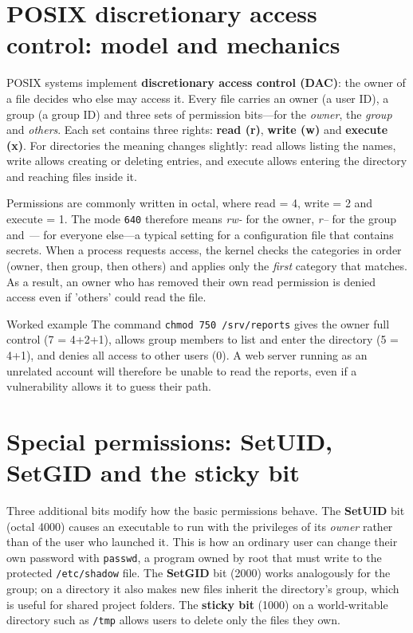 \section{POSIX discretionary access control: model and mechanics}\label{sec:2.1}
POSIX systems implement \textbf{discretionary access control (DAC)}: the owner of a file decides who else may access it. Every file carries an owner (a user ID), a group (a group ID) and three sets of permission bits—for the \emph{owner}, the \emph{group} and \emph{others}. Each set contains three rights: \textbf{read (r)}, \textbf{write (w)} and \textbf{execute (x)}. For directories the meaning changes slightly: read allows listing the names, write allows creating or deleting entries, and execute allows entering the directory and reaching files inside it.

Permissions are commonly written in octal, where read = 4, write = 2 and execute = 1. The mode \texttt{640} therefore means \emph{rw-} for the owner, \emph{r--} for the group and \emph{---} for everyone else—a typical setting for a configuration file that contains secrets. When a process requests access, the kernel checks the categories in order (owner, then group, then others) and applies only the \emph{first} category that matches. As a result, an owner who has removed their own read permission is denied access even if 'others' could read the file.

\begin{examplebox}{Worked example}
The command \texttt{chmod 750 /srv/reports} gives the owner full control (7 = 4+2+1), allows group members to list and enter the directory (5 = 4+1), and denies all access to other users (0). A web server running as an unrelated account will therefore be unable to read the reports, even if a vulnerability allows it to guess their path.
\end{examplebox}

\section{Special permissions: SetUID, SetGID and the sticky bit}\label{sec:2.2}
Three additional bits modify how the basic permissions behave. The \textbf{SetUID} bit (octal 4000) causes an executable to run with the privileges of its \emph{owner} rather than of the user who launched it. This is how an ordinary user can change their own password with \texttt{passwd}, a program owned by root that must write to the protected \texttt{/etc/shadow} file. The \textbf{SetGID} bit (2000) works analogously for the group; on a directory it also makes new files inherit the directory's group, which is useful for shared project folders. The \textbf{sticky bit} (1000) on a world-writable directory such as \texttt{/tmp} allows users to delete only the files they own.

